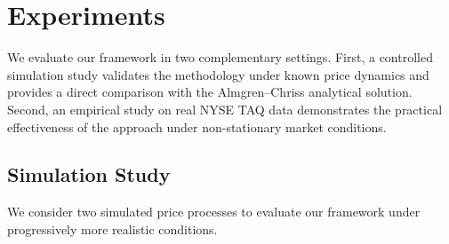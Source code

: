 \documentclass[11pt]{article}
\begin{document}

\section{Experiments}\label{sec:experiments}

We evaluate our framework in two complementary settings.  First, a controlled simulation study validates the methodology under known price dynamics and provides a direct comparison with the Almgren--Chriss analytical solution.  Second, an empirical study on real NYSE TAQ data demonstrates the practical effectiveness of the approach under non-stationary market conditions.

\subsection*{Simulation Study}\label{subsec:simulation}
We consider two simulated price processes to evaluate our framework under progressively more realistic conditions.
\end{document}
